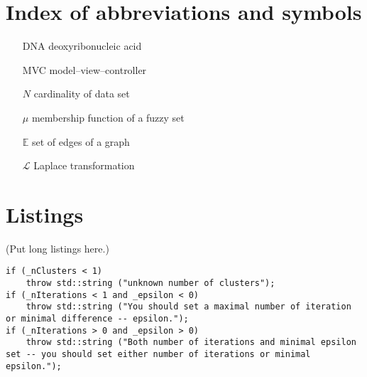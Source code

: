 \documentclass[a4paper,twoside,12pt]{book}
\begin{document}
\begin{appendices}


\chapter{Index of abbreviations and symbols}

\begin{itemize}
\item[DNA] deoxyribonucleic acid
\item[MVC] model--view--controller 
\item[$N$] cardinality of data set
\item[$\mu$] membership function of a fuzzy set
\item[$\mathbb{E}$] set of edges of a graph
\item[$\mathcal{L}$] Laplace transformation
\end{itemize}


\chapter{Listings}

(Put long listings here.)

\begin{lstlisting}
if (_nClusters < 1)
	throw std::string ("unknown number of clusters");
if (_nIterations < 1 and _epsilon < 0)
	throw std::string ("You should set a maximal number of iteration or minimal difference -- epsilon.");
if (_nIterations > 0 and _epsilon > 0)
	throw std::string ("Both number of iterations and minimal epsilon set -- you should set either number of iterations or minimal epsilon.");
\end{lstlisting}





\end{appendices}
\end{document}
